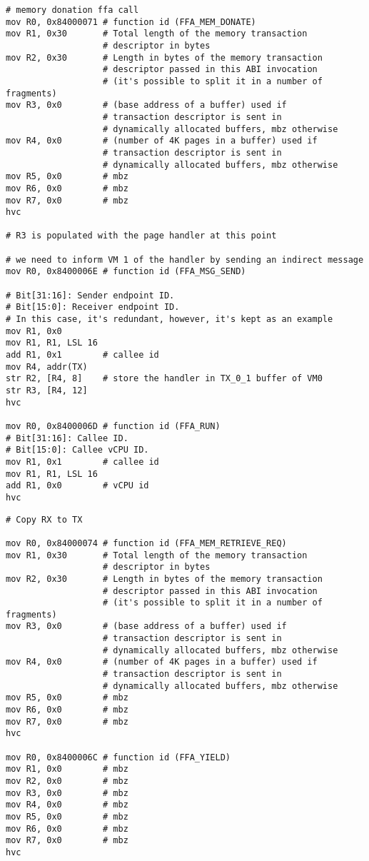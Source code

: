 \documentclass{article}
\begin{document}
\begin{lstlisting}[caption={VM 0}]
# memory donation ffa call
mov R0, 0x84000071 # function id (FFA_MEM_DONATE)
mov R1, 0x30       # Total length of the memory transaction 
                   # descriptor in bytes
mov R2, 0x30       # Length in bytes of the memory transaction 
                   # descriptor passed in this ABI invocation
                   # (it's possible to split it in a number of fragments)
mov R3, 0x0        # (base address of a buffer) used if 
                   # transaction descriptor is sent in 
                   # dynamically allocated buffers, mbz otherwise
mov R4, 0x0        # (number of 4K pages in a buffer) used if 
                   # transaction descriptor is sent in 
                   # dynamically allocated buffers, mbz otherwise
mov R5, 0x0        # mbz
mov R6, 0x0        # mbz
mov R7, 0x0        # mbz
hvc

# R3 is populated with the page handler at this point

# we need to inform VM 1 of the handler by sending an indirect message
mov R0, 0x8400006E # function id (FFA_MSG_SEND)

# Bit[31:16]: Sender endpoint ID.
# Bit[15:0]: Receiver endpoint ID.
# In this case, it's redundant, however, it's kept as an example
mov R1, 0x0
mov R1, R1, LSL 16
add R1, 0x1        # callee id
mov R4, addr(TX)
str R2, [R4, 8]    # store the handler in TX_0_1 buffer of VM0
str R3, [R4, 12]
hvc

mov R0, 0x8400006D # function id (FFA_RUN)
# Bit[31:16]: Callee ID.
# Bit[15:0]: Callee vCPU ID.
mov R1, 0x1        # callee id
mov R1, R1, LSL 16
add R1, 0x0        # vCPU id
hvc
\end{lstlisting}

\begin{lstlisting}[caption={VM 1}]
# Copy RX to TX

mov R0, 0x84000074 # function id (FFA_MEM_RETRIEVE_REQ)
mov R1, 0x30       # Total length of the memory transaction 
                   # descriptor in bytes
mov R2, 0x30       # Length in bytes of the memory transaction 
                   # descriptor passed in this ABI invocation
                   # (it's possible to split it in a number of fragments)
mov R3, 0x0        # (base address of a buffer) used if 
                   # transaction descriptor is sent in 
                   # dynamically allocated buffers, mbz otherwise
mov R4, 0x0        # (number of 4K pages in a buffer) used if 
                   # transaction descriptor is sent in 
                   # dynamically allocated buffers, mbz otherwise
mov R5, 0x0        # mbz
mov R6, 0x0        # mbz
mov R7, 0x0        # mbz
hvc

mov R0, 0x8400006C # function id (FFA_YIELD)
mov R1, 0x0        # mbz
mov R2, 0x0        # mbz
mov R3, 0x0        # mbz
mov R4, 0x0        # mbz
mov R5, 0x0        # mbz
mov R6, 0x0        # mbz
mov R7, 0x0        # mbz
hvc
\end{lstlisting}
\end{document}
